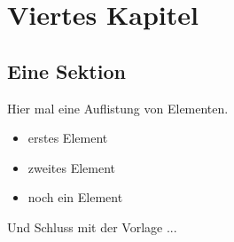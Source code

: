 \chapter{Viertes Kapitel}
\section{Eine Sektion}

Hier mal eine Auflistung von Elementen.
\begin{itemize}
 \item erstes Element
 \item zweites Element
 \item noch ein Element
\end{itemize}

Und Schluss mit der Vorlage ...
